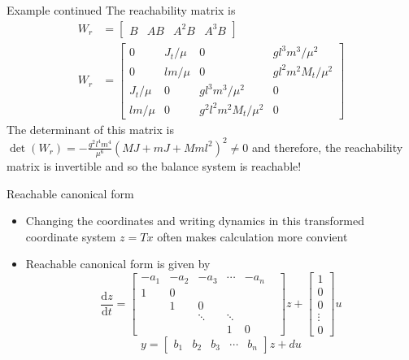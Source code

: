 \documentclass{beamer-control}
\begin{document}
\begin{frame}{Example continued}
The reachability matrix is
\begin{align*}
	W_r&= \begin{bmatrix}
		B & AB & A^2 B & A^3B
	\end{bmatrix} \\ 
	W_r &= \begin{bmatrix}
		0 & J_t/\mu & 0 & gl^3m^3/\mu^2 \\ 
		0 & lm/\mu & 0 & gl^2m^2M_t/\mu^2 \\
		J_t/\mu & 0 & gl^3m^3/\mu^2 & 0 \\
		lm/\mu & 0 & g^2l^2m^2M_t/\mu^2 & 0 
	\end{bmatrix}
\end{align*}
The determinant of this matrix is $\operatorname{det}(W_r)=-\frac{g^2l^4m^4}{\mu^6}(MJ+mJ+Mml^2)^2\neq 0$ and therefore, the reachability matrix is invertible and so the balance system is reachable!
\end{frame}


\begin{frame}{Reachable canonical form}
\begin{itemize}
	\item Changing the coordinates and writing dynamics in this transformed coordinate system $z=Tx$ often makes calculation more convient
	\item Reachable canonical form is given by 
	\[\frac{\mathrm{d}z}{\mathrm{d}t} = \begin{bmatrix}
		-a_1 & -a_2 & -a_3 &  \cdots & -a_n	\\
		1 & 0 & & & \\
		& 1& 0 & & & \\
		& & \ddots & \ddots  & \\
		& & & 1 & 0
			\end{bmatrix}z + \begin{bmatrix}
			1 \\ 0 \\ 0 \\ \vdots \\ 0
			\end{bmatrix} u \]
			\[y=\begin{bmatrix}
				b_1 & b_2 & b_3 & \cdots & b_n
			\end{bmatrix}z + du\]
\end{itemize}
\end{frame}
\end{document}

